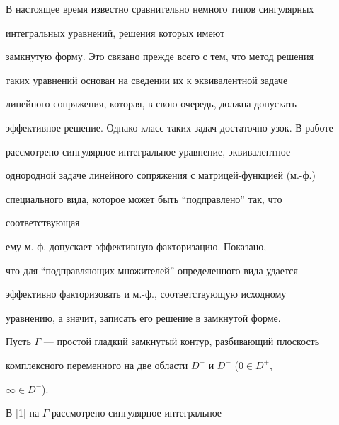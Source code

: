 

\pagestyle{plain} %


 




\maketitle 


\label{begin} 


 


 


В настоящее время известно сравнительно немного типов сингулярных 


интегральных уравнений, решения которых имеют 


замкнутую форму. Это связано прежде всего с тем, что метод решения 


таких уравнений основан на сведении их к эквивалентной задаче 


линейного сопряжения, которая, в свою очередь, должна допускать 


эффективное решение. Однако класс таких задач достаточно узок. В работе 


рассмотрено сингулярное интегральное уравнение, эквивалентное 


однородной задаче линейного сопряжения с матрицей-функцией (м.-ф.) 


специального вида, которое может быть ``подправлено'' так, что 


соответствующая 


ему м.-ф. допускает эффективную факторизацию. Показано, 


что для ``подправляющих множителей'' определенного вида удается 


эффективно факторизовать и м.-ф., соответствующую исходному 


уравнению, а значит, записать его решение в замкнутой форме. 


 


Пусть $\Gamma$ --- простой гладкий замкнутый контур, разбивающий плоскость 


комплексного переменного на две области $D^+$ и $D^-$ ($0\in D^+$, 


$\infty\in D^-$). 


В [1] на $\Gamma$ рассмотрено сингулярное интегральное 


